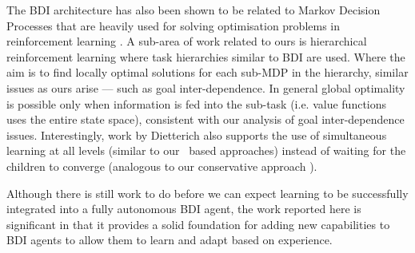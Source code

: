 The BDI architecture has also been shown \cite{simari2006on-th} to be related to Markov Decision Processes that are heavily used for solving optimisation problems in reinforcement learning \cite{Mitchell97:ML}. A sub-area of work related to ours is hierarchical reinforcement learning \cite{barto2003recen} where task hierarchies similar to BDI are used. Where the aim is to find locally optimal solutions for each sub-MDP in the hierarchy, similar issues as ours arise --- such as goal inter-dependence. In general global optimality is possible only when information is fed into the sub-task (i.e. value functions uses the entire state space), consistent with our analysis of goal inter-dependence issues. Interestingly, work by Dietterich \cite{dietterich2000hiera} also supports the use of simultaneous learning at all levels (similar to our \CL\ based approaches) instead of waiting for the children to converge (analogous to our conservative  approach \cite{Singh:AAMAS10}).

Although there is still work to do before we can expect learning to be
successfully integrated into a fully autonomous BDI agent, the
work reported here is significant in that it provides a solid
foundation for adding new capabilities to BDI agents to allow them to
learn and adapt based on experience.

